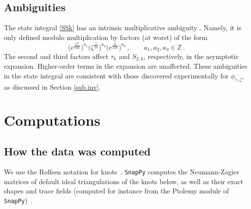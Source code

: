 \documentclass[12pt]{amsart}
\theoremstyle{definition}
\def\be{  \begin{equation} }
\def\ee{  \end{equation} }
\newcommand{\Z}{\mathbb{Z}}
\begin{document}
\subsection{Ambiguities}
\label{sub.ambiguities}

The state integral \eqref{SSk} has an intrinsic multiplicative ambiguity 
\cite[Eqn. 5.8]{D-levelk}. Namely, it is only defined modulo multiplication 
by factors (at worst) of the form
%
\be  
\big(e^{\tfrac{\pi^2}{6k\hbar}}\big)^{a_1}  
\big(\zeta^{\frac{1}{24}}\big)^{a_2} 
\big(e^{\tfrac{\hbar}{24k}}\big)^{a_3}\,,\qquad a_1,a_2,a_3\in \Z\,. 
\ee
%
The second and third factors affect $\tau_{k}$ and $S_{2,k}$, respectively, 
in the asymptotic expansion. Higher-order terms in the expansion are 
unaffected. These ambiguities in the state integral are consistent with 
those discovered experimentally for $\phi_{\gamma,\zeta}$, as discussed in 
Section \ref{sub.inv}.


\section{Computations}
\label{sec.compute}

\subsection{How the data was computed}
\label{sub.conv}

We use the Rolfsen notation for knots~\cite{Rf}. {\tt SnapPy} computes the
Neumann-Zagier matrices of default ideal triangulations of the knots
below, as well as their exact shapes and trace fields (computed for
instance from the Ptolemy module of {\tt SnapPy})~\cite{ptolemy,snappy}.
\end{document}
